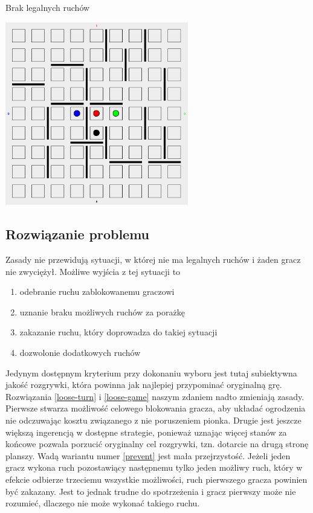 \documentclass{pracamgr}
\begin{document}
\begin{rysunek}
\caption{Brak legalnych ruchów \label{problem}}
\centering
\includegraphics[width=80mm]{no-move.png}
\end{rysunek}

\subsection{Rozwiązanie problemu}

Zasady nie przewidują sytuacji, w której nie ma legalnych ruchów i żaden gracz nie zwyciężył.
Możliwe wyjścia z tej sytuacji to

\begin{enumerate}
\item \label{loose-turn} odebranie ruchu zablokowanemu graczowi
\item \label{loose-game} uznanie braku możliwych ruchów za porażkę
\item \label{prevent} zakazanie ruchu, który doprowadza do takiej sytuacji
\item \label{solve} dozwolonie dodatkowych ruchów
\end {enumerate}

Jedynym dostępnym kryterium przy dokonaniu wyboru jest tutaj subiektywna jakość rozgrywki, która powinna jak najlepiej przypominać oryginalną grę.
Rozwiązania \ref{loose-turn} i \ref{loose-game} naszym zdaniem nadto zmieniają zasady.
Pierwsze stwarza możliwość celowego blokowania gracza, aby układać ogrodzenia nie odczuwając kosztu związanego z nie poruszeniem pionka.
Drugie jest jeszcze większą ingerencją w dostępne strategie, ponieważ uznając więcej stanów za końcowe pozwala porzucić oryginalny cel rozgrywki, tzn. dotarcie na drugą stronę planszy.
Wadą wariantu numer \ref{prevent} jest mała przejrzystość.
Jeżeli jeden gracz wykona ruch pozostawiący następnemu tylko jeden możliwy ruch, który w efekcie odbierze trzeciemu wszystkie możliwości, ruch pierwszego gracza powinien być zakazany.
Jest to jednak trudne do spotrzeżenia i gracz pierwszy może nie rozumieć, dlaczego nie może wykonać takiego ruchu.
\end{document}
